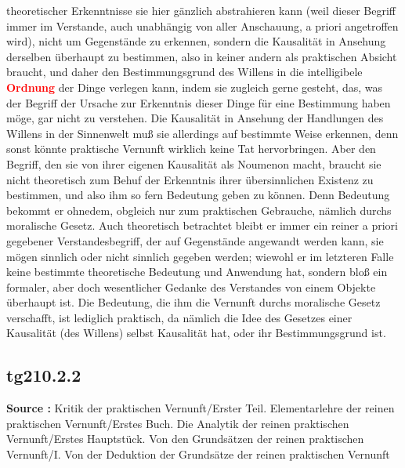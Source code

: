 \documentclass[a4paper,12pt,twoside]{book}
\newcommand{\match}[1]{\textcolor{red}{\textbf{#1}}}
\begin{document}
theoretischer Erkenntnisse sie hier gänzlich abstrahieren kann (weil dieser Begriff immer im Verstande, auch unabhängig von aller Anschauung, a priori angetroffen wird), nicht um Gegenstände zu erkennen, sondern die Kausalität in Ansehung derselben überhaupt zu bestimmen, also in keiner andern als praktischen Absicht braucht, und daher den Bestimmungsgrund des Willens in die intelligibele \match{Ordnung} der Dinge verlegen kann, indem sie zugleich gerne gesteht, das, was der Begriff der Ursache zur Erkenntnis dieser Dinge für eine Bestimmung haben möge, gar nicht zu verstehen. Die Kausalität in Ansehung der Handlungen des Willens in der Sinnenwelt muß sie allerdings auf bestimmte Weise erkennen, denn sonst könnte praktische Vernunft wirklich keine Tat hervorbringen. Aber den Begriff, den sie von ihrer eigenen Kausalität als Noumenon macht, braucht sie nicht theoretisch zum Behuf der Erkenntnis ihrer übersinnlichen Existenz zu bestimmen, und also ihm so fern Bedeutung geben zu können. Denn Bedeutung bekommt  er ohnedem, obgleich nur zum praktischen Gebrauche, nämlich durchs moralische Gesetz. Auch theoretisch betrachtet bleibt er immer ein reiner a priori gegebener Verstandesbegriff, der auf Gegenstände angewandt werden kann, sie mögen sinnlich oder nicht sinnlich gegeben werden; wiewohl er im letzteren Falle keine bestimmte theoretische Bedeutung und Anwendung hat, sondern bloß ein formaler, aber doch wesentlicher Gedanke des Verstandes von einem Objekte überhaupt ist. Die Bedeutung, die ihm die Vernunft durchs moralische Gesetz verschafft, ist lediglich praktisch, da nämlich die Idee des Gesetzes einer Kausalität (des Willens) selbst Kausalität hat, oder ihr Bestimmungsgrund ist. 
	
	\subsection*{tg210.2.2} 
	\textbf{Source : }Kritik der praktischen Vernunft/Erster Teil. Elementarlehre der reinen praktischen Vernunft/Erstes Buch. Die Analytik der reinen praktischen Vernunft/Erstes Hauptstück. Von den Grundsätzen der reinen praktischen Vernunft/I. Von der Deduktion der Grundsätze der reinen praktischen Vernunft\\  
	
\end{document}
